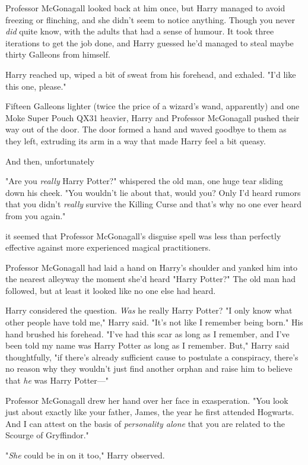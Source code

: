 Professor McGonagall looked back at him once, but Harry managed to avoid
freezing or flinching, and she didn't seem to notice anything. Though you never
\emph{did} quite know, with the adults that had a sense of humour. It took
three iterations to get the job done, and Harry guessed he'd managed to steal
maybe thirty Galleons from himself.

Harry reached up, wiped a bit of sweat from his forehead, and exhaled. "I'd
like this one, please."

Fifteen Galleons lighter (twice the price of a wizard's wand, apparently) and
one Moke Super Pouch QX31 heavier, Harry and Professor McGonagall pushed their
way out of the door. The door formed a hand and waved goodbye to them as they
left, extruding its arm in a way that made Harry feel a bit queasy.

And then, unfortunately{\el}

"Are you \emph{really} Harry Potter?" whispered the old man, one huge tear
sliding down his cheek. "You wouldn't lie about that, would you? Only I'd heard
rumors that you didn't \emph{really} survive the Killing Curse and that's why
no one ever heard from you again."

{\el} it seemed that Professor McGonagall's disguise spell was less than
perfectly effective against more experienced magical practitioners.

Professor McGonagall had laid a hand on Harry's shoulder and yanked him into
the nearest alleyway the moment she'd heard "Harry Potter?" The old man had
followed, but at least it looked like no one else had heard.

Harry considered the question. \emph{Was} he really Harry Potter? "I only know
what other people have told me," Harry said. "It's not like I remember being
born." His hand brushed his forehead. "I've had this scar as long as I
remember, and I've been told my name was Harry Potter as long as I remember.
But," Harry said thoughtfully, "if there's already sufficient cause to
postulate a conspiracy, there's no reason why they wouldn't just find another
orphan and raise him to believe that \emph{he} was Harry Potter—"

Professor McGonagall drew her hand over her face in exasperation. "You look
just about exactly like your father, James, the year he first attended
Hogwarts. And I can attest on the basis of \emph{personality alone} that you
are related to the Scourge of Gryffindor."

"\emph{She} could be in on it too," Harry observed.

